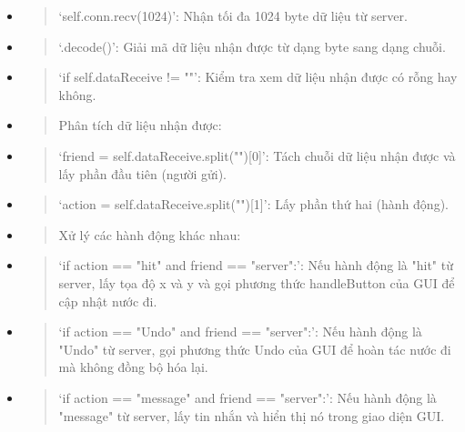 \documentclass[a4paper]{article}
\begin{document}
\begin{itemize}
\item
  \begin{quote}
  `self.conn.recv(1024)': Nhận tối đa 1024 byte dữ liệu từ server.
  \end{quote}
\item
  \begin{quote}
  `.decode()': Giải mã dữ liệu nhận được từ dạng byte sang dạng chuỗi.
  \end{quote}
\end{itemize}

\begin{itemize}
\item
  \begin{quote}
  `if self.dataReceive != ""': Kiểm tra xem dữ liệu nhận được có rỗng
  hay không.
  \end{quote}
\item
  \begin{quote}
  Phân tích dữ liệu nhận được:
  \end{quote}
\end{itemize}

\begin{itemize}
\item
  \begin{quote}
  `friend = self.dataReceive.split("\textbar"){[}0{]}': Tách chuỗi dữ
  liệu nhận được và lấy phần đầu tiên (người gửi).
  \end{quote}
\item
  \begin{quote}
  `action = self.dataReceive.split("\textbar"){[}1{]}': Lấy phần thứ hai
  (hành động).
  \end{quote}
\end{itemize}

\begin{itemize}
\item
  \begin{quote}
  Xử lý các hành động khác nhau:
  \end{quote}
\end{itemize}

\begin{itemize}
\item
  \begin{quote}
  `if action == "hit" and friend == "server":': Nếu hành động là "hit"
  từ server, lấy tọa độ x và y và gọi phương thức handleButton của GUI
  để cập nhật nước đi.
  \end{quote}
\item
  \begin{quote}
  `if action == "Undo" and friend == "server":': Nếu hành động là "Undo"
  từ server, gọi phương thức Undo của GUI để hoàn tác nước đi mà không
  đồng bộ hóa lại.
  \end{quote}
\item
  \begin{quote}
  `if action == "message" and friend == "server":': Nếu hành động là
  "message" từ server, lấy tin nhắn và hiển thị nó trong giao diện GUI.
  \end{quote}
\end{itemize}
\end{document}
